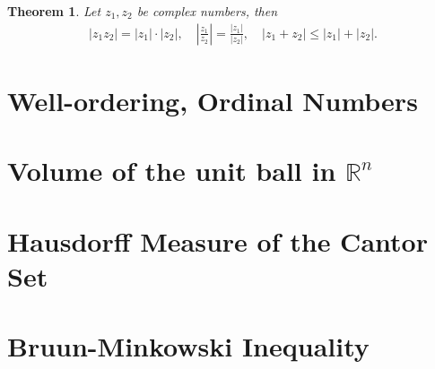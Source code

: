 \documentclass[11pt]{book}
\newtheorem{theorem}{Theorem}[chapter]
\theoremstyle{definition}
\numberwithin{equation}{chapter}
\begin{document}
\medskip

\begin{theorem}
Let $z_1, z_2$ be complex numbers, then 
\begin{align*}
    \left|z_1 z_2\right| = \left|z_1\right| \cdot \left|z_2\right|, \quad \left|\frac{z_1}{z_2}\right| = \frac{\left|z_1\right|}{\left|z_2\right|}, \quad \left|z_1 + z_2\right| \leq \left|z_1\right| + \left|z_2\right|.
\end{align*}
\end{theorem}








%






\begin{appendices}
\chapter{Well-ordering, Ordinal Numbers}\label{appendix_a}



\chapter{Volume of the unit ball in $\mathbb{R}^n$}\label{appendix_b}



\chapter{Hausdorff Measure of the Cantor Set}\label{appendix_c}



\chapter{Bruun-Minkowski Inequality}\label{appendix_d}




\end{appendices}

\newpage


\end{document}
